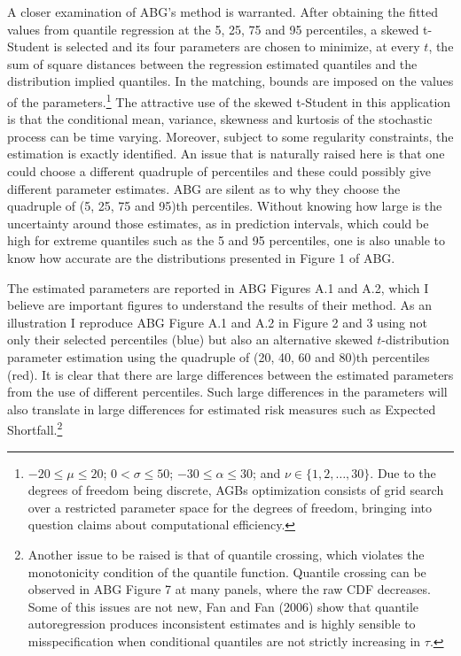 \documentclass[11pt,]{article}
\let\rmarkdownfootnote\footnote%
\def\footnote{\protect\rmarkdownfootnote}
\begin{document}
A closer examination of ABG's method is warranted. After obtaining the
fitted values from quantile regression at the 5, 25, 75 and 95
percentiles, a skewed t-Student is selected and its four parameters are
chosen to minimize, at every \(t\), the sum of square distances between
the regression estimated quantiles and the distribution implied
quantiles. In the matching, bounds are imposed on the values of the
parameters.\footnote{$-20 \leq \mu \leq 20$; $0 < \sigma \leq 50$; $-30 \leq \alpha \leq 30$; and $\nu \in \{1,2, \dots,30\}$. Due to the degrees of freedom being discrete, AGBs optimization consists of grid search over a restricted parameter space for the degrees of freedom, bringing into question claims about computational efficiency.}
The attractive use of the skewed t-Student in this application is that
the conditional mean, variance, skewness and kurtosis of the stochastic
process can be time varying. Moreover, subject to some regularity
constraints, the estimation is exactly identified. An issue that is
naturally raised here is that one could choose a different quadruple of
percentiles and these could possibly give different parameter estimates.
ABG are silent as to why they choose the quadruple of (5, 25, 75 and
95)th percentiles. Without knowing how large is the uncertainty around
those estimates, as in prediction intervals, which could be high for
extreme quantiles such as the 5 and 95 percentiles, one is also unable
to know how accurate are the distributions presented in Figure 1 of ABG.

The estimated parameters are reported in ABG Figures A.1 and A.2, which
I believe are important figures to understand the results of their
method. As an illustration I reproduce ABG Figure A.1 and A.2 in Figure
2 and 3 using not only their selected percentiles (blue) but also an
alternative skewed \(t\)-distribution parameter estimation using the
quadruple of (20, 40, 60 and 80)th percentiles (red). It is clear that
there are large differences between the estimated parameters from the
use of different percentiles. Such large differences in the parameters
will also translate in large differences for estimated risk measures
such as Expected
Shortfall.\footnote{Another issue to be raised is that of quantile crossing, which violates the monotonicity condition of the quantile function. Quantile crossing can be observed in ABG Figure 7 at many panels, where the raw CDF decreases. Some of this issues are not new, Fan and Fan (2006) show that quantile autoregression produces inconsistent estimates and is highly sensible to misspecification when conditional quantiles are not strictly increasing in $\tau$.}
\end{document}
